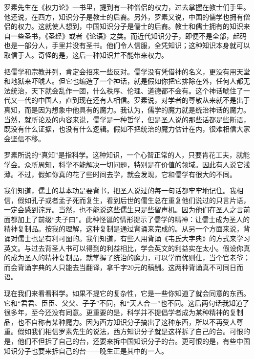 罗素先生在《权力论》一书里，提到有一种僧侣的权力，过去掌握在教士们手里。他还说，在西方，知识分子是教士的后裔。另外，罗素又说，中国的儒学也拥有僧侣的权力。这就使人想到，中国知识分子是儒士的后裔。教士和儒士拥有的知识来自一些圣书，《圣经》或者《论语》之类。而近代知识分子，即便不是全部，起码也是一部分人，手里并没有圣书。他们令人信服，全凭知识；这种知识本身就可以取信于人。奇怪的是，这后一种知识并不能带来权力。 

把儒学和宗教并列，肯定会招来一些反对。儒学没有凭借神的名义，更没有用天堂和地狱来吓唬人。但它也编造了一个神话，就是假如你把它排除在外，任何人都无法统治，天下就会乱作一团，什么秩序、伦理、道德都不会有。这个神话唬住了一代又一代的中国人，直到现在还有人相信。罗素说，对学者的尊敬从来就不是出于真知，而是因为想象中他具有的魔力。我认为，儒学的魔力就是统治神话的魔力。当然，就所论及的内容来说，儒学是一种哲学，但是圣人说的那些话都是些断语，既没有什么证据，也没有什么逻辑。假如不把统治的魔力估计在内，很难相信大家会坚信不移。 

罗素所说的“真知”是指科学。这种知识，一个心智正常的人，只要肯花工夫，就能学会。众所周知，科学不能解决一切问题，特别是在价值的领域。因此有人说它浅薄。不过，假如你真的花了些时间去学，就会发现，它和儒学有很大的不同。 

我们知道，儒士的基本功是要背书，把圣人说过的每一句话都牢牢地记住。我相信，假如孔子或者孟子死而复生，看到后世的儒生总在重复他们说过的只言片语，一定会感到诧异。当然，也不能说这些儒生只是些留声机。因为他们在圣人之言前面都加上了前缀“夫子曰”。此种怪诞的情形提示了儒学的精神：让儒士成为圣人的精神复制品。按我的理解，这种复制是通过背诵来完成的。从另一个方面来说，背诵对儒士也是有利可图的。我们知道，有些人用背诵《韦氏大字典》的方式来学习英文。与过去背圣人书可以得到的利益相比，学会英文的利益实在太小。假设你真的成为圣人的精神复制品，就掌握了统治的魔力，可以学而优则仕，当个官老爷；而会背诵字典的人只能去当翻译，拿千字20元的稿酬。这两种背诵真不可同日而语。 

现在我们来看看科学。如果不提它的复杂性，它是一些你知道了就会同意的东西。它和“君君、臣臣、父父、子子”不同，和“天人合一”也不同。这后两句话我知道了很多年，至今还没有同意。更重要的是，科学并不提倡学者成为某种精神的复制品，也不自称有某种魔力。因为西方知识分子搞出了这种东西，所以不再受人尊重。假如我们相信罗素先生的说法，西方知识分子就是这样拆了自己的台。可恨的是，他们不但拆了自己的台，还要来拆中国知识分子的台。更可恨的是，有些中国知识分子也要来拆自己的台——晚生正是其中的一人。 

